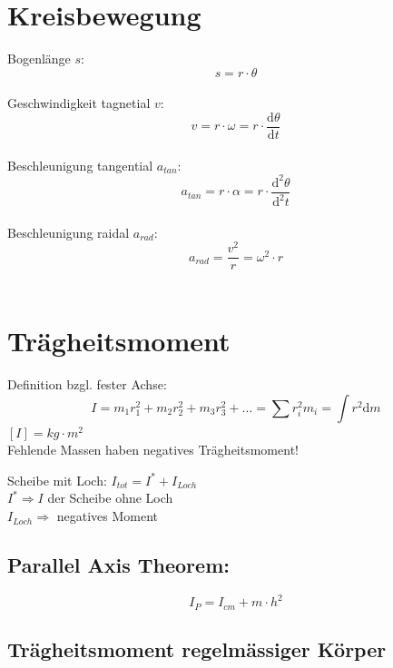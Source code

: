 \section{Kreisbewegung}
Bogenlänge $s$:
\[\boxed{s=r \cdot \theta} \]\\
Geschwindigkeit tagnetial $v$:
\[\boxed{v=r \cdot \omega=r\cdot\frac{\mathrm{d}\theta}{\mathrm{d}t}} \]\\
Beschleunigung tangential $a_{tan}$:
\[\boxed{a_{tan}=r \cdot \alpha=r\cdot\frac{\mathrm{d}^2\theta}{\mathrm{d}^2t}} \]\\
Beschleunigung raidal $a_{rad}$:
\[\boxed{a_{rad}=\frac{v^2}{r}=\omega^2\cdot r } \]\\

\section{Trägheitsmoment}
Definition bzgl. fester Achse:
\[
	\boxed{
		I=m_1r_1^2+m_2r_2^2+m_3r_3^2+\ldots=\sum{r_i^2m_i}=\int{r^2\mathrm{d}m}
	}
\]
$[I]=kg\cdot m^2$\\
\newline
Fehlende Massen haben negatives Trägheitsmoment!\\
\newline
\begin{footnotesize}
	Scheibe mit Loch: $I_{tot}=I^*+I_{Loch}$\\
	$I^*\Rightarrow I$ der Scheibe ohne Loch\\
	$I_{Loch}\Rightarrow$ negatives Moment
\end{footnotesize}

\subsection{Parallel Axis Theorem:}
\[
	\boxed{
		I_P=I_{cm}+m\cdot h^2
	}
\]

\newpage
\subsection{Trägheitsmoment regelmässiger Körper}

